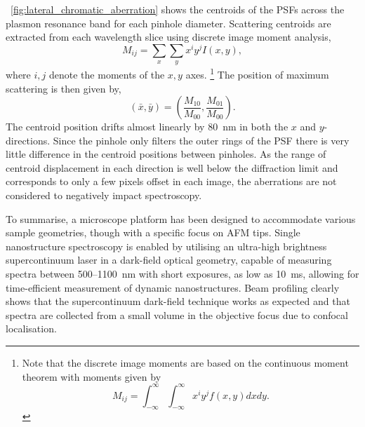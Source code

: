 \documentclass{article}
\begin{document}
\figurename~\ref{fig:lateral_chromatic_aberration} shows the centroids of the PSFs across the plasmon resonance band for each pinhole diameter. Scattering centroids are extracted from each wavelength slice using discrete image moment analysis,
\begin{equation}
	M_{ij} = \sum_x \sum_y x^i y^j I(x,y),
	\label{eq:image_moments}
\end{equation}
where $i,j$ denote the moments of the $x,y$ axes.%
\footnote{Note that the discrete image moments are based on the continuous moment theorem with moments given by $$M_{ij} = \int_{-\infty}^{\infty} \int_{-\infty}^{\infty} x^i y^j f(x,y) dx dy.$$}
The position of maximum scattering is then given by,
\begin{equation}
	(\bar{x},\bar{y}) = \left( \frac{M_{10}}{M_{00}}, \frac{M_{01}}{M_{00}} \right).
	\label{eq:centroid_position}
\end{equation}
The centroid position drifts almost linearly by \SI{80}{nm} in both the $x$ and $y$-directions. Since the pinhole only filters the outer rings of the PSF there is very little difference in the centroid positions between pinholes. As the range of centroid displacement in each direction is well below the diffraction limit and corresponds to only a few pixels offset in each image, the aberrations are not considered to negatively impact spectroscopy. %

To summarise, a microscope platform has been designed to accommodate various sample geometries, though with a specific focus on AFM tips. Single nanostructure spectroscopy is enabled by utilising an ultra-high brightness supercontinuum laser in a dark-field optical geometry, capable of measuring spectra between 500--\SI{1100}{nm} with short exposures, as low as \SI{10}{ms}, allowing for time-efficient measurement of dynamic nanostructures. Beam profiling clearly shows that the supercontinuum dark-field technique works as expected and that spectra are collected from a small volume in the objective focus due to confocal localisation.

\FloatBarrier
\end{document}
